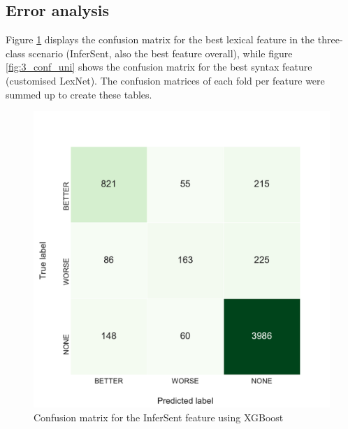\FloatBarrier
\subsection{Error analysis}
\label{sec:error_analysis}
Figure \ref{fig:3_conf_inf} displays the confusion matrix for the best lexical feature in the three-class scenario (InferSent, also the best feature overall), while figure \ref{fig:3_conf_uni} shows the confusion matrix for the best syntax feature (customised LexNet).
 The confusion matrices of each fold per feature were summed up to create these tables.





\begin{figure}[h]
    \begin{minipage}{.5\linewidth}
   \caption{Confusion matrix for the InferSent feature using XGBoost} 
    \label{fig:3_conf_inf}
 \centering
	\includegraphics[width=1\linewidth]{images/experiments/conf-InferSent_False}
  \end{minipage} \hfill
    \begin{minipage}{.5\linewidth}
  

\end{minipage}
\end{figure}
